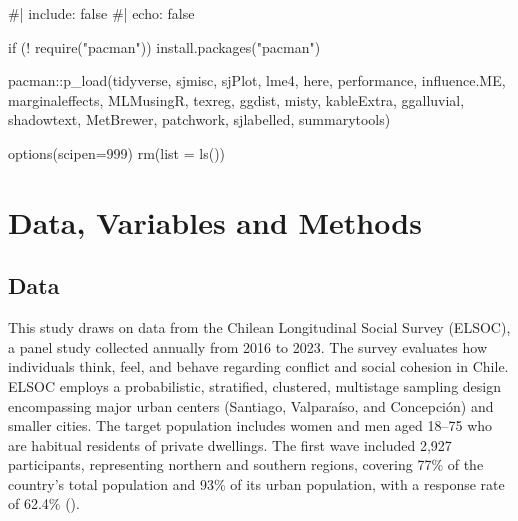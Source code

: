 \documentclass[
  12pt,
]{article}
\newenvironment{Shaded}{\begin{snugshade}}{\end{snugshade}}
\newcommand{\AttributeTok}[1]{\textcolor[rgb]{0.40,0.45,0.13}{#1}}
\newcommand{\CommentTok}[1]{\textcolor[rgb]{0.37,0.37,0.37}{#1}}
\newcommand{\ControlFlowTok}[1]{\textcolor[rgb]{0.00,0.23,0.31}{#1}}
\newcommand{\DecValTok}[1]{\textcolor[rgb]{0.68,0.00,0.00}{#1}}
\newcommand{\FunctionTok}[1]{\textcolor[rgb]{0.28,0.35,0.67}{#1}}
\newcommand{\NormalTok}[1]{\textcolor[rgb]{0.00,0.23,0.31}{#1}}
\newcommand{\SpecialCharTok}[1]{\textcolor[rgb]{0.37,0.37,0.37}{#1}}
\newcommand{\StringTok}[1]{\textcolor[rgb]{0.13,0.47,0.30}{#1}}
\begin{document}
\begin{Shaded}
\begin{Highlighting}[]
\CommentTok{\#| include: false}
\CommentTok{\#| echo: false}

\ControlFlowTok{if}\NormalTok{ (}\SpecialCharTok{!} \FunctionTok{require}\NormalTok{(}\StringTok{"pacman"}\NormalTok{)) }\FunctionTok{install.packages}\NormalTok{(}\StringTok{"pacman"}\NormalTok{)}

\NormalTok{pacman}\SpecialCharTok{::}\FunctionTok{p\_load}\NormalTok{(tidyverse, }
\NormalTok{               sjmisc, }
\NormalTok{               sjPlot, }
\NormalTok{               lme4, }
\NormalTok{               here, }
\NormalTok{               performance,}
\NormalTok{               influence.ME, }
\NormalTok{               marginaleffects,}
\NormalTok{               MLMusingR,}
\NormalTok{               texreg, }
\NormalTok{               ggdist,}
\NormalTok{               misty,}
\NormalTok{               kableExtra,}
\NormalTok{               ggalluvial, }
\NormalTok{               shadowtext,}
\NormalTok{               MetBrewer,}
\NormalTok{               patchwork,}
\NormalTok{               sjlabelled,}
\NormalTok{               summarytools)}


\FunctionTok{options}\NormalTok{(}\AttributeTok{scipen=}\DecValTok{999}\NormalTok{)}
\FunctionTok{rm}\NormalTok{(}\AttributeTok{list =} \FunctionTok{ls}\NormalTok{())}
\end{Highlighting}
\end{Shaded}

\section{Data, Variables and Methods}\label{data-variables-and-methods}

\subsection{Data}\label{data}

This study draws on data from the Chilean Longitudinal Social Survey
(ELSOC), a panel study collected annually from 2016 to 2023. The survey
evaluates how individuals think, feel, and behave regarding conflict and
social cohesion in Chile. ELSOC employs a probabilistic, stratified,
clustered, multistage sampling design encompassing major urban centers
(Santiago, Valparaíso, and Concepción) and smaller cities. The target
population includes women and men aged 18--75 who are habitual residents
of private dwellings. The first wave included 2,927 participants,
representing northern and southern regions, covering 77\% of the
country's total population and 93\% of its urban population, with a
response rate of 62.4\% ().
\end{document}
